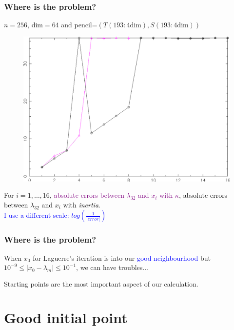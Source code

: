 \documentclass{beamer}
\theoremstyle{definition} \newtheorem{de}{Def}
\theoremstyle{remark} \newtheorem{os}[de]{Remark}
\theoremstyle{plain} \newtheorem{te}[de]{Teo}
\theoremstyle{plain} \newtheorem{co}[de]{Cor}
\theoremstyle{plain} \newtheorem{pr}[de]{Prop}
\theoremstyle{plain} \newtheorem{lem}[de]{Lemm}
\theoremstyle{remark} \newtheorem{rem}[de]{Remark}
\begin{document}
\begin{frame}
  \frametitle{Where is the problem?}

  $n=256$, $\text{dim}=64$ and pencil=$(T(193:4\text{dim}),S(193:4\text{dim}))$

  \begin{figure}
    \centering
    \includegraphics[scale=0.3]{images/ConfrontoLagItInerziaKappa_scala_logaritmica_reciproco.pdf}
  \end{figure}

For $i=1,\dots,16$, \textcolor{purple}{absolute errors between $\lambda_{32}$ and $x_i$ with $\kappa$}, \textcolor{black}{absolute errors between $\lambda_{32}$ and $x_i$ with \emph{inertia}}. \\
\textcolor{blue}{I use a different scale: $log(\frac{1}{|error|})$}

\end{frame}

\begin{frame}
  \frametitle{Where is the problem?}

  When $x_0$ for Laguerre's iteration is into our \textcolor{blue}{good neighbourhood} but $10^{-9} \le |x_0-\lambda_m|\le 10^{-1}$, we can have troubles...

  \pause

  Starting points are the most important aspect of our calculation.

\end{frame}

\section{Good initial point}
\end{document}
